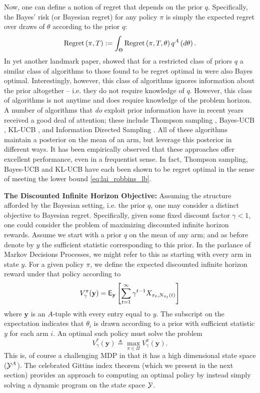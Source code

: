 Now, one can define a notion of regret that depends on the prior $q$. Specifically, the Bayes' risk (or Bayesian regret) for any policy $\pi$ is simply the expected regret over draws of $\theta$ according to the prior $q$:
\[
\textnormal{Regret} \left( \pi, T \right) := \int_\Theta \textnormal{Regret} \left( \pi, T, \theta \right) q^A\left(d\theta\right).
\]
In yet another landmark paper, \cite{lai1987adaptive} showed that for a restricted class of priors $q$ a similar class of algorithms to those found to be regret optimal in \citep{lai1985asymptotically} were also Bayes optimal. Interestingly, however, this class of algorithms ignores information about the prior altogether -- i.e. they do not require knowledge of $q$.
However, this class of algorithms is not anytime and does require knowledge of the problem horizon.
A number of algorithms that {\em do} exploit prior information have in recent years received a good deal of attention; these include Thompson sampling \citep{thompson1933likelihood}, Bayes-UCB \citep{kaufmann2012thompson}, KL-UCB \citep{garivier2011kl}, and Information Directed Sampling \citep{russo2014learning}. All of these algorithms maintain a posterior on the mean of an arm, but leverage this posterior in different ways. It has been empirically observed that these approaches offer excellent performance, even in a frequentist sense. In fact, Thompson sampling, Bayes-UCB and KL-UCB have each been shown to be regret optimal in the sense of meeting the lower bound  \eqref{eq:lai_robbins_lb}. 
 
\noindent\textbf{\textsf{The Discounted Infinite Horizon Objective: }}Assuming the structure afforded by the Bayesian setting, i.e. the prior $q$, one may consider a distinct objective to Bayesian regret. Specifically, given some fixed discount factor $\gamma < 1$, one could consider the problem of maximizing discounted infinite horizon rewards. Assume we start with a prior $q$ on the mean of any arm; and as before denote by $y$ the sufficient statistic corresponding to this prior. In the parlance of Markov Decisions Processes, we might refer to this as starting with every arm in state $y$. For a given policy $\pi$, we define the expected discounted infinite horizon reward under that policy according to
\[
V^\pi_\gamma(\mathbf{y}) 
=
\mathsf{E}_{\mathbf{y}}
\left[
	\sum_{t=1}^\infty \gamma^{t-1} X_{\pi_t,N_{\pi_t}(t)}
\right]
\]
where $\mathbf{y}$ is an $A$-tuple with every entry equal to $y$. The subscript on the expectation indicates that $\theta_i$ is drawn according to a prior with sufficient statistic $y$ for each arm $i$. An optimal such policy must solve the problem
\[
V^*_\gamma(\mathbf{y}) 
\triangleq 
\max_{\pi \in \Pi} V^\pi_\gamma(\mathbf{y}). 
\]
This is, of course a challenging MDP in that it has a high dimensional state space ($\mathcal Y^A$). The celebrated Gittins index theorem (which we present in the next section) provides an approach to computing an optimal policy by instead simply solving a dynamic program on the state space $\mathcal Y$. 



